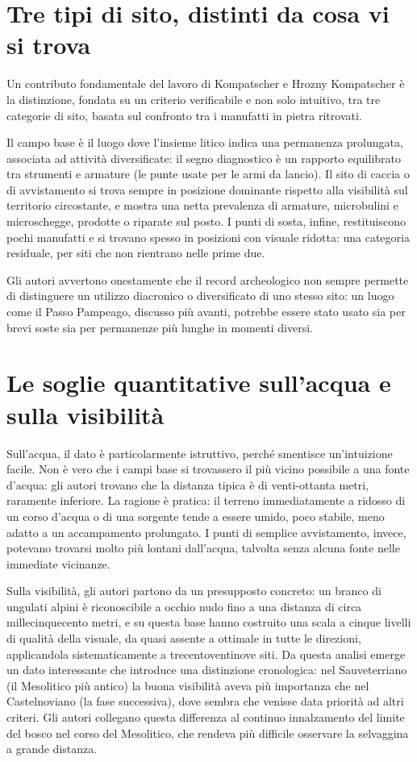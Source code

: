 \section{Tre tipi di sito, distinti da cosa vi si trova}

Un contributo fondamentale del lavoro di Kompatscher e Hrozny Kompatscher è la distinzione, fondata su un criterio verificabile e non solo intuitivo, tra tre categorie di sito, basata sul confronto tra i manufatti in pietra ritrovati.

Il campo base è il luogo dove l'insieme litico indica una permanenza prolungata, associata ad attività diversificate: il segno diagnostico è un rapporto equilibrato tra strumenti e armature (le punte usate per le armi da lancio). Il sito di caccia o di avvistamento si trova sempre in posizione dominante rispetto alla visibilità sul territorio circostante, e mostra una netta prevalenza di armature, microbulini e microschegge, prodotte o riparate sul posto. I punti di sosta, infine, restituiscono pochi manufatti e si trovano spesso in posizioni con visuale ridotta: una categoria residuale, per siti che non rientrano nelle prime due.

Gli autori avvertono onestamente che il record archeologico non sempre permette di distinguere un utilizzo diacronico o diversificato di uno stesso sito: un luogo come il Passo Pampeago, discusso più avanti, potrebbe essere stato usato sia per brevi soste sia per permanenze più lunghe in momenti diversi.

\section{Le soglie quantitative sull'acqua e sulla visibilità}

Sull'acqua, il dato è particolarmente istruttivo, perché smentisce un'intuizione facile. Non è vero che i campi base si trovassero il più vicino possibile a una fonte d'acqua: gli autori trovano che la distanza tipica è di venti-ottanta metri, raramente inferiore. La ragione è pratica: il terreno immediatamente a ridosso di un corso d'acqua o di una sorgente tende a essere umido, poco stabile, meno adatto a un accampamento prolungato. I punti di semplice avvistamento, invece, potevano trovarsi molto più lontani dall'acqua, talvolta senza alcuna fonte nelle immediate vicinanze.

Sulla visibilità, gli autori partono da un presupposto concreto: un branco di ungulati alpini è riconoscibile a occhio nudo fino a una distanza di circa millecinquecento metri, e su questa base hanno costruito una scala a cinque livelli di qualità della visuale, da quasi assente a ottimale in tutte le direzioni, applicandola sistematicamente a trecentoventinove siti. Da questa analisi emerge un dato interessante che introduce una distinzione cronologica: nel Sauveterriano (il Mesolitico più antico) la buona visibilità aveva più importanza che nel Castelnoviano (la fase successiva), dove sembra che venisse data priorità ad altri criteri. Gli autori collegano questa differenza al continuo innalzamento del limite del bosco nel corso del Mesolitico, che rendeva più difficile osservare la selvaggina a grande distanza.

